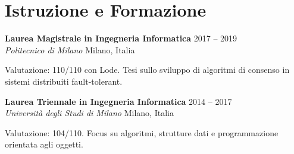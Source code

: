 \documentclass[10pt,a4paper]{article}
\newcommand{\educationitem}[4]{
  \noindent\textbf{#1} \hfill {\color{lighttext}\small #2} \\
  \noindent\textit{#3} \hfill {\color{lighttext}\small #4} \\
  \vspace{0.2em}
}
\begin{document}
\begin{minipage}[t]{0.62\textwidth}
  \vspace{1.0em}
  
  \section*{Istruzione e Formazione}
  
  \educationitem{Laurea Magistrale in Ingegneria Informatica}{2017 -- 2019}{Politecnico di Milano}{Milano, Italia}
  Valutazione: 110/110 con Lode. Tesi sullo sviluppo di algoritmi di consenso in sistemi distribuiti fault-tolerant.
  
  \vspace{0.6em}
  
  \educationitem{Laurea Triennale in Ingegneria Informatica}{2014 -- 2017}{Università degli Studi di Milano}{Milano, Italia}
  Valutazione: 104/110. Focus su algoritmi, strutture dati e programmazione orientata agli oggetti.

\end{minipage}
\hfill
\end{document}
